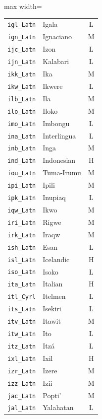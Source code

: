 {\begin{adjustbox}{max width=\textwidth}
\begin{tabular}{llc}
        \texttt{igl\_Latn} & Igala & L \\
        \texttt{ign\_Latn} & Ignaciano & M \\
        \texttt{ijc\_Latn} & Izon & L \\
        \texttt{ijn\_Latn} & Kalabari & L \\
        \texttt{ikk\_Latn} & Ika & M \\
        \texttt{ikw\_Latn} & Ikwere & L \\
        \texttt{ilb\_Latn} & Ila & M \\
        \texttt{ilo\_Latn} & Iloko & M \\
        \texttt{imo\_Latn} & Imbongu & L \\
        \texttt{ina\_Latn} & Interlingua & L \\
        \texttt{inb\_Latn} & Inga & M \\
        \texttt{ind\_Latn} & Indonesian & H \\
        \texttt{iou\_Latn} & Tuma-Irumu & M \\
        \texttt{ipi\_Latn} & Ipili & M \\
        \texttt{ipk\_Latn} & Inupiaq & L \\
        \texttt{iqw\_Latn} & Ikwo & M \\
        \texttt{iri\_Latn} & Rigwe & M \\
        \texttt{irk\_Latn} & Iraqw & M \\
        \texttt{ish\_Latn} & Esan & L \\
        \texttt{isl\_Latn} & Icelandic & H \\
        \texttt{iso\_Latn} & Isoko & L \\
        \texttt{ita\_Latn} & Italian & H \\
        \texttt{itl\_Cyrl} & Itelmen & L \\
        \texttt{its\_Latn} & Isekiri & L \\
        \texttt{itv\_Latn} & Itawit & M \\
        \texttt{itw\_Latn} & Ito & L \\
        \texttt{itz\_Latn} & Itzá & L \\
        \texttt{ixl\_Latn} & Ixil & H \\
        \texttt{izr\_Latn} & Izere & M \\
        \texttt{izz\_Latn} & Izii & M \\
        \texttt{jac\_Latn} & Popti' & M \\
        \texttt{jal\_Latn} & Yalahatan & L \\

\end{tabular}
\end{adjustbox}}
